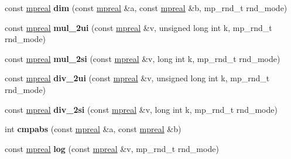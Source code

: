 \begin{DoxyCompactItemize}
\item 
\mbox{\label{classmpfr_1_1mpreal_a5bbe70209401df6af53abb48b0929bf4}} 
const \hyperlink{classmpfr_1_1mpreal}{mpreal} {\bfseries dim} (const \hyperlink{classmpfr_1_1mpreal}{mpreal} \&a, const \hyperlink{classmpfr_1_1mpreal}{mpreal} \&b, mp\+\_\+rnd\+\_\+t rnd\+\_\+mode)
\item 
\mbox{\label{classmpfr_1_1mpreal_a70f39512ad54db1a5ea710fa65d0aaeb}} 
const \hyperlink{classmpfr_1_1mpreal}{mpreal} {\bfseries mul\+\_\+2ui} (const \hyperlink{classmpfr_1_1mpreal}{mpreal} \&v, unsigned long int k, mp\+\_\+rnd\+\_\+t rnd\+\_\+mode)
\item 
\mbox{\label{classmpfr_1_1mpreal_a078571e7f5f07d7635eb81cb6d57c7a5}} 
const \hyperlink{classmpfr_1_1mpreal}{mpreal} {\bfseries mul\+\_\+2si} (const \hyperlink{classmpfr_1_1mpreal}{mpreal} \&v, long int k, mp\+\_\+rnd\+\_\+t rnd\+\_\+mode)
\item 
\mbox{\label{classmpfr_1_1mpreal_ab104903d3f12e40a2253675d67c9ed4d}} 
const \hyperlink{classmpfr_1_1mpreal}{mpreal} {\bfseries div\+\_\+2ui} (const \hyperlink{classmpfr_1_1mpreal}{mpreal} \&v, unsigned long int k, mp\+\_\+rnd\+\_\+t rnd\+\_\+mode)
\item 
\mbox{\label{classmpfr_1_1mpreal_a4d586a0ae7faa982be27c39fa249fdbd}} 
const \hyperlink{classmpfr_1_1mpreal}{mpreal} {\bfseries div\+\_\+2si} (const \hyperlink{classmpfr_1_1mpreal}{mpreal} \&v, long int k, mp\+\_\+rnd\+\_\+t rnd\+\_\+mode)
\item 
\mbox{\label{classmpfr_1_1mpreal_ac27aec15567e6dc87bd2305636d36aad}} 
int {\bfseries cmpabs} (const \hyperlink{classmpfr_1_1mpreal}{mpreal} \&a, const \hyperlink{classmpfr_1_1mpreal}{mpreal} \&b)
\item 
\mbox{\label{classmpfr_1_1mpreal_a7b075c2ae9b8a9874cc19a7ff00e183b}} 
const \hyperlink{classmpfr_1_1mpreal}{mpreal} {\bfseries log} (const \hyperlink{classmpfr_1_1mpreal}{mpreal} \&v, mp\+\_\+rnd\+\_\+t rnd\+\_\+mode)
\item 
\mbox{\label{classmpfr_1_1mpreal_a50f1e80f8bb61a9ff2200b6a6c02cb1e}} 

\end{DoxyCompactItemize}
